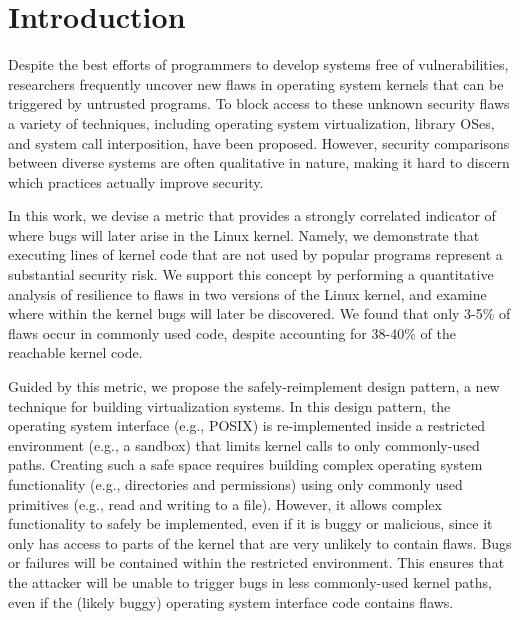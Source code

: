 \section{Introduction}
\label{sec.introduction}

Despite the best efforts of programmers to develop systems free of vulnerabilities,
researchers frequently uncover new flaws in operating system kernels that can be
triggered by untrusted programs. To block access to these unknown security flaws
a variety of techniques, including operating system virtualization, library OSes,
and system call interposition, have been proposed. However, security comparisons
between diverse systems are often qualitative in nature, making it hard to
discern which practices actually improve security.

In this work, we devise a metric that provides a strongly correlated 
indicator of where bugs will later arise in the Linux kernel. Namely, we demonstrate
that executing lines of kernel code that are not used by popular programs represent
a substantial security risk. We support this concept by performing a quantitative
 analysis of resilience to flaws in two versions of the Linux kernel, and examine
where within the kernel bugs will later be discovered. We found that only 3-5\%
  of flaws occur in commonly used code, despite accounting for
 38-40\%  of the reachable kernel code.

Guided by this metric, we propose the safely-reimplement design pattern, a new
technique for building virtualization systems. In this design pattern, the operating
system interface (e.g., POSIX) is re-implemented inside a restricted environment
(e.g., a sandbox) that limits kernel calls to only commonly-used paths.
Creating such a safe space requires building complex operating system functionality
(e.g., directories and permissions) using only commonly used primitives (e.g.,
read and writing to a file). However, it allows complex functionality to safely
be implemented, even if it is buggy or malicious, since it only has access to
parts of the kernel that are very unlikely to contain flaws. Bugs or failures
will be contained within the restricted environment. This ensures that the attacker
will be unable to trigger bugs in less commonly-used kernel paths, even if the
 (likely buggy) operating system interface code contains flaws.

